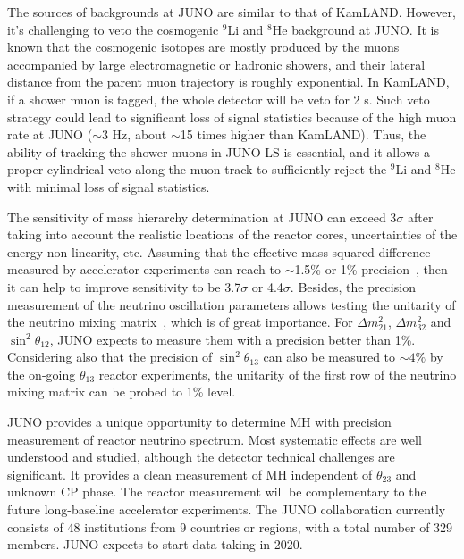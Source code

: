 
The sources of backgrounds at JUNO are similar to that of KamLAND. However, it's challenging to veto the cosmogenic $^9$Li and $^8$He background at JUNO. It is known that the cosmogenic isotopes are mostly produced by the muons accompanied by large electromagnetic or hadronic showers, and their lateral distance from the parent muon trajectory is roughly exponential. In KamLAND, if a shower muon is tagged, the whole detector will be veto for 2 s. Such veto strategy could lead to significant loss of signal statistics because of the high muon rate at JUNO ($\sim$3 Hz, about $\sim$15 times higher than KamLAND). Thus, the ability of tracking the shower muons in JUNO LS is essential, and it allows a proper cylindrical veto along the muon track to sufficiently reject the $^9$Li and $^8$He with minimal loss of signal statistics.

The sensitivity of mass hierarchy determination at JUNO can exceed 3$\sigma$ after taking into account the realistic locations of the reactor cores, uncertainties of the energy non-linearity, etc. Assuming that the effective mass-squared difference measured by accelerator experiments can reach to $\sim$1.5\% or 1\% precision~\cite{Agarwalla}, then it can help to improve sensitivity to be 3.7$\sigma$ or 4.4$\sigma$\cite{Li-PRD13}. Besides, the precision measurement of the neutrino oscillation parameters allows testing the unitarity of the neutrino mixing matrix~\cite{unitarity13}, which is of great importance. For $\Delta m^2_{21}$, $\Delta m^2_{32}$ and $\sin^2\theta_{12}$, JUNO expects to measure them with a precision better than 1\%. Considering also that the precision of $\sin^2\theta_{13}$ can also be measured to $\sim4\%$ by the on-going $\theta_{13}$ reactor experiments, the unitarity of the first row of the neutrino mixing matrix can be probed to 1\% level.

JUNO provides a unique opportunity to determine MH with precision measurement of reactor neutrino spectrum. Most systematic effects are well understood and studied, although the detector technical challenges are significant. It provides a clean measurement of MH independent of $\theta_{23}$ and unknown CP phase. The reactor measurement will be complementary to the future long-baseline accelerator experiments. The JUNO collaboration currently consists of 48 institutions from 9 countries or regions, with a total number of 329 members. JUNO expects to start data taking in 2020.

